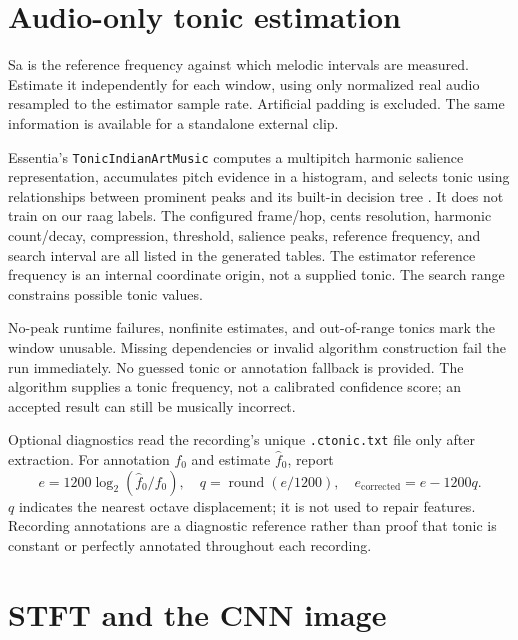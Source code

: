 \documentclass[11pt,a4paper]{article}
\begin{document}
\section{Audio-only tonic estimation}
Sa is the reference frequency against which melodic intervals are measured.
Estimate it independently for each window, using only normalized real audio
resampled to the estimator sample rate. Artificial padding is excluded.
The same information is available for a standalone external clip.

Essentia's \texttt{TonicIndianArtMusic} computes a multipitch harmonic salience
representation, accumulates pitch evidence in a histogram, and selects tonic
using relationships between prominent peaks and its built-in decision tree
\cite{tonic,essentia}. It does not train on our raag labels. The configured
frame/hop, cents resolution, harmonic count/decay, compression, threshold,
salience peaks, reference frequency, and search interval are all listed in the
generated tables. The estimator reference frequency is an internal coordinate
origin, not a supplied tonic. The search range constrains possible tonic values.

No-peak runtime failures, nonfinite estimates, and out-of-range tonics mark the
window unusable. Missing dependencies or invalid algorithm construction fail
the run immediately. No guessed tonic or annotation fallback is provided.
The algorithm supplies a tonic frequency, not a calibrated confidence score;
an accepted result can still be musically incorrect.

Optional diagnostics read the recording's unique \texttt{.ctonic.txt} file only
after extraction. For annotation $f_0$ and estimate $\widehat f_0$, report
\[
e=1200\log_2(\widehat f_0/f_0),\quad
q=\operatorname{round}(e/1200),\quad e_{\mathrm{corrected}}=e-1200q.
\]
$q$ indicates the nearest octave displacement; it is not used to repair features.
Recording annotations are a diagnostic reference rather than proof that tonic
is constant or perfectly annotated throughout each recording.

\section{STFT and the CNN image}
\end{document}

